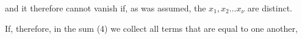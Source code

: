 and it therefore cannot vanish if, as was assumed,
the $x_1, x_2 \ldots x_\nu$ are distinct.

If, therefore, in the sum (4) we collect all terms that are equal
to one another, 
